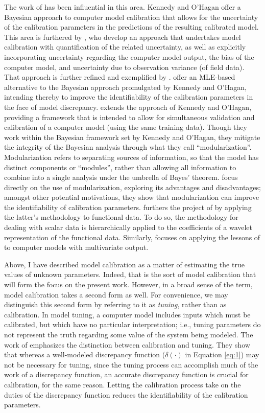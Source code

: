 \documentclass{article}
\begin{document}
The work of \cite{Kennedy2001} has been influential in this area. Kennedy and O'Hagan offer a Bayesian approach to computer model calibration that allows for the uncertainty of the calibration parameters in the predictions of the resulting calibrated model. This area is furthered by \cite{Higdon2004}, who develop an approach that undertakes model calibration with quantification of the related uncertainty, as well as explicitly incorporating uncertainty regarding the computer model output, the bias of the computer model, and uncertainty due to observation variance (of field data). That approach is further refined and exemplified by \cite{Williams2006}.
\cite{Loeppky2006} offer an MLE-based alternative to the Bayesian approach promulgated by Kennedy and O'Hagan, intending thereby to improve the identifiability of the calibration parameters in the face of model discrepancy. 
\cite{Bayarri2007} extends the approach of Kennedy and O'Hagan, providing a framework that is intended to allow for simultaneous validation and calibration of a computer model (using the same training data). Though they  work within the Bayesian framework set by Kennedy and O'Hagan, they mitigate the integrity of the Bayesian analysis through what they call ``modularization''. Modularization refers to separating sources of information, so that the model has distinct components or ``modules'', rather than allowing all information to combine into a single analysis under the umbrella of Bayes' theorem. \cite{Liu2009} focus directly on the use of modularization, exploring its advantages and disadvantages; amongst other potential motivations, they show that modularization can improve the identifiability of calibration parameters. 
\cite{Bayarri} furthers the project of \cite{Bayarri2007} by applying the latter's methodology to functional data. To do so, the methodology for dealing with scalar data is hierarchically applied to the coefficients of a wavelet representation of the functional data. Similarly, \cite{Paulo2012} focuses on applying the lessons of \cite{Bayarri2007} to computer models with multivariate output.

Above, I have described model calibration as a matter of estimating the true values of unknown parameters. Indeed, that is the sort of model calibration that will form the focus on the present work. However, in a broad sense of the term, model calibration takes a second form as well. For convenience, we may distinguish this second form by referring to it as \emph{tuning}, rather than as calibration. In model tuning, a computer model includes inputs which must be calibrated, but which have no particular interpretation; i.e., tuning parameters do not represent the truth regarding some value of the system being modeled. The work of \cite{Brynjarsdottir2014} emphasizes the distinction between calibration and tuning. They show that whereas a well-modeled discrepancy function ($\delta(\cdot)$ in Equation \ref{eq:1}) may not be necessary for tuning, since the tuning process can accomplish much of the work of a discrepancy function, an accurate discrepancy function is crucial for calibration, for the same reason. Letting the calibration process take on the duties of the discrepancy function reduces the identifiability of the calibration parameters.
\end{document}
